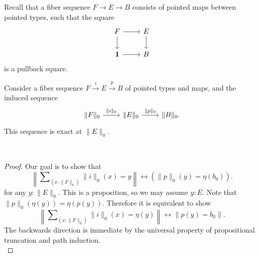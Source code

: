 \documentclass[handout]{beamer}
\newcommand{\brck}[1]{\|#1\|}
\newcommand{\trunc}[2]{\|#2\|_{#1}}
\newcommand{\unit}{\mathbf{1}}
\begin{document}
\begin{frame}
  Recall that a fiber sequence $F\to E\to B$ consists of pointed maps between pointed types, such that the square
  \begin{equation*}
    \begin{tikzcd}[ampersand replacement=\&]
      F \arrow[d] \arrow[r] \& E \arrow[d] \\
      \unit \arrow[r] \& B
    \end{tikzcd}
  \end{equation*}
  is a pullback square.
  
  \begin{lemma}
    Consider a fiber sequence $F\stackrel{i}{\to} E\stackrel{p}{\to} B$ of pointed types and maps, and the induced sequence
    \begin{equation*}
      \begin{tikzcd}[ampersand replacement=\&]
        \trunc{0}{F}\arrow[r,"\trunc{0}{i}"] \& \trunc{0}{E} \arrow[r,"\trunc{0}{p}"] \& \trunc{0}{B}.
      \end{tikzcd}
    \end{equation*}
    This sequence is exact at $\trunc{0}{E}$.
  \end{lemma}
\end{frame}

\begin{frame}
  \\[3em]
  \begin{proof}
    Our goal is to show that
    \begin{equation*}
      \left\|\sum\nolimits_{(x:\trunc{0}{F})}\trunc{0}{i}(x)=y\right\|\leftrightarrow (\trunc{0}{p}(y)=\eta(b_0)).
    \end{equation*}
    for any $y:\trunc{0}{E}$. This is a proposition, so we may assume $y:E$. Note that $\trunc{0}{p}(\eta(y))=\eta(p(y))$. Therefore it is equivalent to show
    \begin{equation*}
      \left\|\sum\nolimits_{(x:\trunc{0}{F})}\trunc{0}{i}(x)=\eta(y)\right\|\leftrightarrow \brck{p(y)=b_0}.
    \end{equation*}
    The backwards direction is immediate by the universal property of propositional truncation and path induction. \\[10em]
  \end{proof}
\end{frame}
\end{document}
